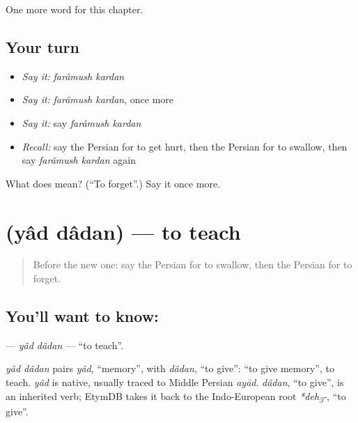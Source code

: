 \begin{grammarlens}[title={What you've built}]
One more word for this chapter.
\end{grammarlens}

\subsection*{Your turn}
\begin{itemize}
\raggedright
  \item \emph{Say it:} \emph{farâmush kardan}
  \item \emph{Say it:} \emph{farâmush kardan}, once more
  \item \emph{Say it:} say \emph{farâmush kardan}
  \item \emph{Recall:} say the Persian for to get hurt, then the Persian for to swallow, then say \emph{farâmush kardan} again
\end{itemize}

\begin{tcolorbox}[breakable,colback=teal!4,colframe=teal!35!black,title={Before you move on}]
What does   mean? (\textquotedblleft{}To forget\textquotedblright{}.) Say it once more.
\end{tcolorbox}
\section[\texorpdfstring{\fa{یاد} \fa{دادن} (yâd dâdan)}{یاد دادن (yâd dâdan)}]{  (yâd dâdan) — to teach}

\label{lesson:FA-C143-yad-dadan}



\begin{quote}
Before the new one: say the Persian for to swallow, then the Persian for to forget.
\end{quote}

\subsection*{You'll want to know:  }
\textbf{ } — \emph{yâd dâdan} — \textquotedblleft{}to teach\textquotedblright{}.

\begin{cousinweb}
\emph{yâd dâdan} pairs \emph{yâd}, \textquotedblleft{}memory\textquotedblright{}, with \emph{dâdan}, \textquotedblleft{}to give\textquotedblright{}: \textquotedblleft{}to give memory\textquotedblright{}, to teach. \emph{yâd} is native, usually traced to Middle Persian \emph{ayād}. \emph{dâdan}, \textquotedblleft{}to give\textquotedblright{}, is an inherited verb; EtymDB takes it back to the Indo-European root \emph{*deh\textsubscript{3}-}, \textquotedblleft{}to give\textquotedblright{}.
\end{cousinweb}

